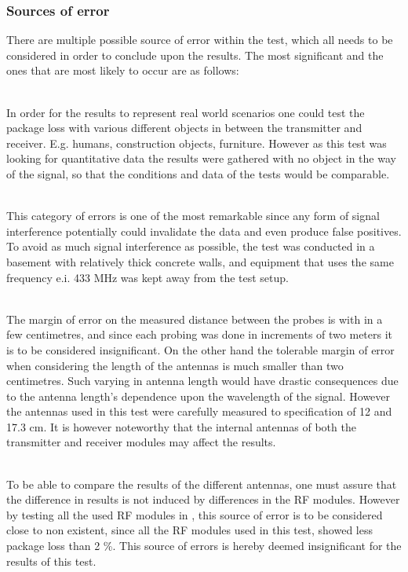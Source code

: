 \subsubsection*{Sources of error}
There are multiple possible source of error within the test, which all needs to be considered in order to conclude upon the results.
The most significant and the ones that are most likely to occur are as follows:
\begin{description}[labelindent=\parindent]
    \item[Objects placed in the way of the signal] \hfill \\
    In order for the results to represent real world scenarios one could test the package loss with various different objects in between the transmitter and receiver. 
    E.g. humans, construction objects, furniture.
    However as this test was     looking for quantitative data the results were gathered with no object in the way of the signal, so that the conditions and data of the tests would be comparable.
    \item[Signal interference] \hfill \\
    This category of errors is one of the most remarkable since any form of signal interference potentially could invalidate the data and even produce false positives.
    To avoid as much signal interference as possible, the test was conducted in a basement with relatively thick concrete walls, and equipment that uses the same frequency e.i. 433 MHz was kept away from the test setup.
    \item[Inaccuracy in distance and antenna length] \hfill \\
    The margin of error on the measured distance between the probes is with in a few centimetres, and since each probing was done in increments of two meters it is to be considered insignificant.
    On the other hand the tolerable margin of error when considering the length of the antennas is much smaller than two centimetres.
    Such varying in antenna length would have drastic consequences due to the antenna length's dependence upon the wavelength of the signal.
    However the antennas used in this test were carefully measured to specification of 12 and 17.3 cm.
    It is however noteworthy that the internal antennas of both the transmitter and receiver modules may affect the results.
    \item[Difference in RF modules] \hfill \\
    To be able to compare the results of the different antennas, one must assure that the difference in results is not induced by differences in the RF modules.
    However by testing all the used RF modules in , this source of error is to be considered close to non existent, since all the RF modules used in this test, showed less package loss than 2 \%.
    This source of errors is hereby deemed insignificant for the results of this test.
\end{description}
  
